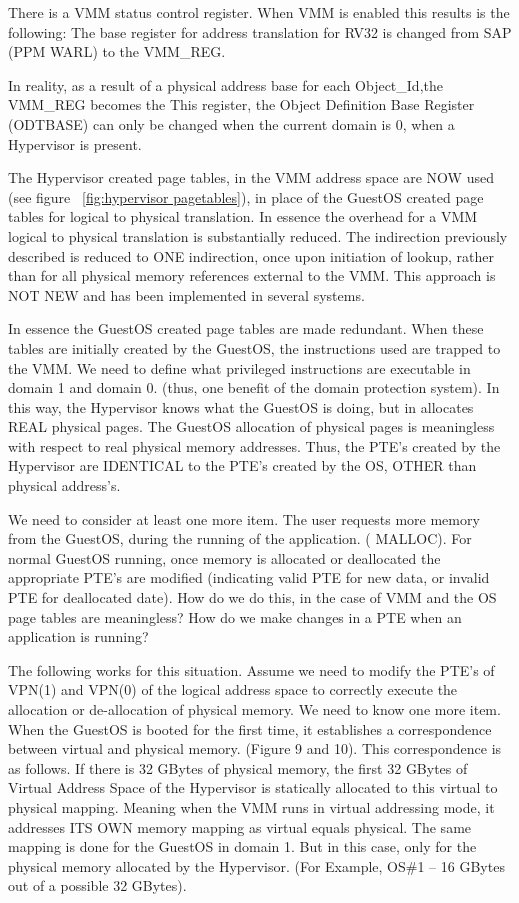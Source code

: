 \documentclass{article}
\begin{document}
There is a VMM status  control register.  When VMM is enabled this results is the following: The base register for address translation for RV32 is changed from SAP (PPM WARL)  to the VMM\_REG. 

 In reality, as a result of a physical address base for each Object\_Id,the VMM\_REG becomes the    This register,  the Object Definition Base Register (ODTBASE)  can only be changed when the current domain is 0, when a Hypervisor is present.


 The Hypervisor created page tables, in the VMM address space are NOW used (see figure ~\ref{fig:hypervisor pagetables}), in place of the GuestOS created page tables for logical to physical  translation.   In essence the overhead for a VMM logical to physical  translation is substantially reduced.   The indirection previously described is reduced to ONE indirection, once upon   initiation of lookup,  rather than for all physical memory references external to the VMM. This approach is NOT NEW and has been implemented in several systems.

In essence the GuestOS created page tables are made redundant.  When these tables are initially created by the GuestOS,   the instructions used are trapped to the VMM.  We need to define what privileged instructions are executable in domain 1 and domain 0.  (thus, one benefit of the domain protection system). In this way,  the Hypervisor knows what the GuestOS is doing, but in allocates REAL physical pages.  The GuestOS allocation of physical pages is  meaningless with respect to real physical memory addresses. Thus, the PTE’s created by the Hypervisor are IDENTICAL to the PTE’s created by the OS, OTHER than physical address’s.  

We need to consider at least one more item.  The user requests more memory from the GuestOS, during the running of the application. ( MALLOC).  For normal GuestOS running,  once memory is allocated or deallocated the appropriate PTE’s are modified (indicating valid PTE for new data, or invalid PTE for deallocated date). How do we do this, in the case of VMM and the OS page tables are meaningless?   How do we make changes in a PTE when an application is running?

The following works for this situation.  Assume we need to modify the PTE’s of VPN(1) and VPN(0) of the logical address space  to correctly execute the allocation or de-allocation of physical memory. We need to know one more item.  When the GuestOS is booted for the first time,  it establishes a correspondence  between virtual and physical memory. (Figure 9 and 10). This correspondence is as follows.  If there is 32 GBytes of physical memory,  the first 32 GBytes of Virtual Address Space of the Hypervisor is statically allocated  to this virtual to physical  mapping. Meaning when the VMM runs in virtual addressing mode,  it addresses ITS OWN memory mapping as virtual equals physical.  The same mapping is done for the GuestOS in domain 1.  But in this case, only for the physical memory allocated by the Hypervisor. (For Example, OS\#1 – 16 GBytes out of a possible 32 GBytes).
\end{document}
